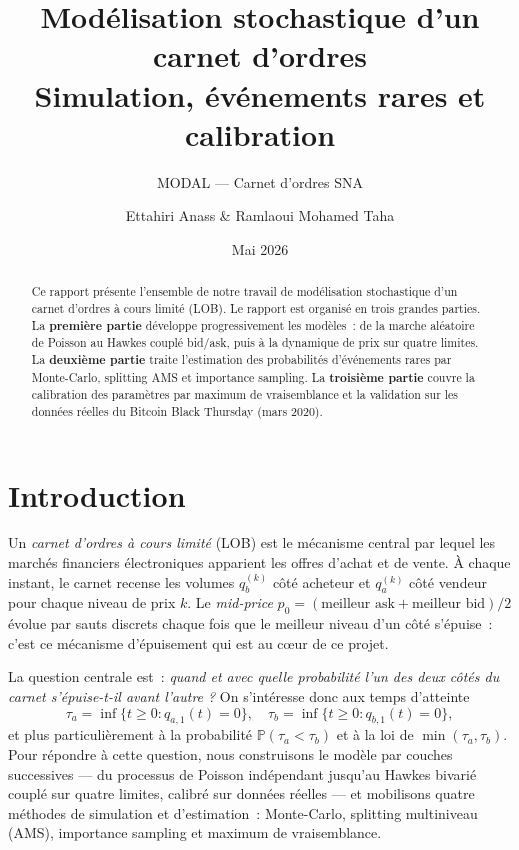 \documentclass[11pt,a4paper]{article}
\title[Carnet d'ordres SNA]{%
  Modélisation stochastique d'un carnet d'ordres \\
  Simulation, événements rares et calibration
}
\subtitle{MODAL --- Carnet d'ordres SNA}
\author{Ettahiri Anass \& Ramlaoui Mohamed Taha}
\date{Mai 2026}
\theoremstyle{definition}
\newcommand{\Pb}{\mathbb{P}}
\begin{document}
\maketitle
\vspace{0.3em}

\begin{abstract}
\noindent
Ce rapport présente l'ensemble de notre travail de modélisation stochastique
d'un carnet d'ordres à cours limité (LOB). Le rapport est organisé en trois
grandes parties. La \textbf{première partie} développe progressivement les modèles~:
de la marche aléatoire de Poisson au Hawkes couplé bid/ask, puis à la dynamique
de prix sur quatre limites. La \textbf{deuxième partie} traite l'estimation des
probabilités d'événements rares par Monte-Carlo, splitting AMS et importance
sampling. La \textbf{troisième partie} couvre la calibration des paramètres par
maximum de vraisemblance et la validation sur les données réelles du Bitcoin Black
Thursday (mars 2020). 
\end{abstract}

\tableofcontents
\newpage

\section*{Introduction}

Un \emph{carnet d'ordres à cours limité} (LOB) est le mécanisme central par
lequel les marchés financiers électroniques apparient les offres d'achat et de
vente. À chaque instant, le carnet recense les volumes $q_b^{(k)}$ côté
acheteur et $q_a^{(k)}$ côté vendeur pour chaque niveau de prix $k$. Le
\emph{mid-price} $p_0 = (\text{meilleur ask}+\text{meilleur bid})/2$ évolue
par sauts discrets chaque fois que le meilleur niveau d'un côté s'épuise~:
c'est ce mécanisme d'épuisement qui est au cœur de ce projet.

La question centrale est~: \emph{quand et avec quelle probabilité l'un des
deux côtés du carnet s'épuise-t-il avant l'autre ?} On s'intéresse donc aux
temps d'atteinte
\[
  \tau_a = \inf\{t\ge 0 : q_{a,1}(t)=0\},\quad
  \tau_b = \inf\{t\ge 0 : q_{b,1}(t)=0\},
\]
et plus particulièrement à la probabilité $\Pb(\tau_a<\tau_b)$ et à la loi de
$\min(\tau_a,\tau_b)$. Pour répondre à cette question, nous construisons le
modèle par couches successives — du processus de Poisson indépendant jusqu'au
Hawkes bivarié couplé sur quatre limites, calibré sur données réelles — et
mobilisons quatre méthodes de simulation et d'estimation~: Monte-Carlo,
splitting multiniveau (AMS), importance sampling et maximum de vraisemblance.
\end{document}
